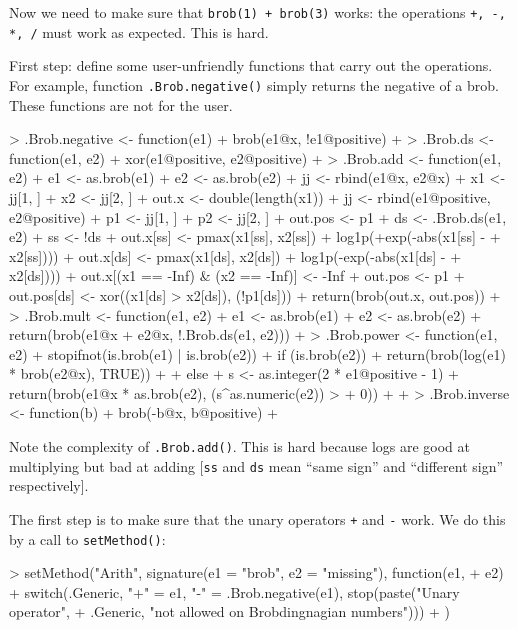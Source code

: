\documentclass[a4paper]{article}
\begin{document}
Now we need to make sure that {\tt brob(1) + brob(3)} works: the
operations {\tt +, -, *, /} must work as expected.  This is hard.

First step: define some user-unfriendly functions that carry out the
operations.  For example, function {\tt .Brob.negative()} simply
returns the negative of a brob.  These functions are not for the user.


\begin{Schunk}
\begin{Sinput}
> .Brob.negative <- function(e1) {
+     brob(e1@x, !e1@positive)
+ }
> .Brob.ds <- function(e1, e2) {
+     xor(e1@positive, e2@positive)
+ }
> .Brob.add <- function(e1, e2) {
+     e1 <- as.brob(e1)
+     e2 <- as.brob(e2)
+     jj <- rbind(e1@x, e2@x)
+     x1 <- jj[1, ]
+     x2 <- jj[2, ]
+     out.x <- double(length(x1))
+     jj <- rbind(e1@positive, e2@positive)
+     p1 <- jj[1, ]
+     p2 <- jj[2, ]
+     out.pos <- p1
+     ds <- .Brob.ds(e1, e2)
+     ss <- !ds
+     out.x[ss] <- pmax(x1[ss], x2[ss]) + log1p(+exp(-abs(x1[ss] - 
+         x2[ss])))
+     out.x[ds] <- pmax(x1[ds], x2[ds]) + log1p(-exp(-abs(x1[ds] - 
+         x2[ds])))
+     out.x[(x1 == -Inf) & (x2 == -Inf)] <- -Inf
+     out.pos <- p1
+     out.pos[ds] <- xor((x1[ds] > x2[ds]), (!p1[ds]))
+     return(brob(out.x, out.pos))
+ }
> .Brob.mult <- function(e1, e2) {
+     e1 <- as.brob(e1)
+     e2 <- as.brob(e2)
+     return(brob(e1@x + e2@x, !.Brob.ds(e1, e2)))
+ }
> .Brob.power <- function(e1, e2) {
+     stopifnot(is.brob(e1) | is.brob(e2))
+     if (is.brob(e2)) {
+         return(brob(log(e1) * brob(e2@x), TRUE))
+     }
+     else {
+         s <- as.integer(2 * e1@positive - 1)
+         return(brob(e1@x * as.brob(e2), (s^as.numeric(e2)) > 
+             0))
+     }
+ }
> .Brob.inverse <- function(b) {
+     brob(-b@x, b@positive)
+ }
\end{Sinput}
\end{Schunk}

Note the complexity of {\tt .Brob.add()}.  This is hard because logs
are good at multiplying but bad at adding [{\tt ss} and {\tt ds} mean
``same sign'' and ``different sign'' respectively].

The first step is to make sure that the unary operators {\tt +} and
{\tt -} work.  We do this by a call to {\tt setMethod()}:


\begin{Schunk}
\begin{Sinput}
> setMethod("Arith", signature(e1 = "brob", e2 = "missing"), function(e1, 
+     e2) {
+     switch(.Generic, "+" = e1, "-" = .Brob.negative(e1), stop(paste("Unary operator", 
+         .Generic, "not allowed on Brobdingnagian numbers")))
+ })
\end{Sinput}
\end{Schunk}
\end{document}
